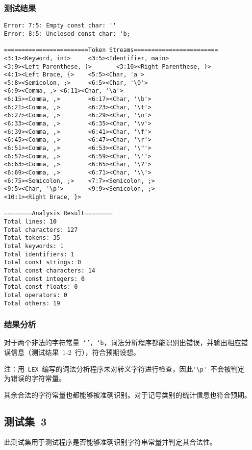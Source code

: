 \documentclass[lang=cn,11pt,a4paper]{paper}
\begin{document}
\subsubsection{测试结果}

\begin{lstlisting}
Error: 7:5: Empty const char: ''
Error: 8:5: Unclosed const char: 'b;

========================Token Streams========================
<3:1><Keyword, int>     <3:5><Identifier, main>
<3:9><Left Parenthese, (>       <3:10><Right Parenthese, )>
<4:1><Left Brace, {>    <5:5><Char, 'a'>
<5:8><Semicolon, ;>     <6:5><Char, '\0'>
<6:9><Comma, ,> <6:11><Char, '\a'>
<6:15><Comma, ,>        <6:17><Char, '\b'>
<6:21><Comma, ,>        <6:23><Char, '\t'>
<6:27><Comma, ,>        <6:29><Char, '\n'>
<6:33><Comma, ,>        <6:35><Char, '\v'>
<6:39><Comma, ,>        <6:41><Char, '\f'>
<6:45><Comma, ,>        <6:47><Char, '\r'>
<6:51><Comma, ,>        <6:53><Char, '\"'>
<6:57><Comma, ,>        <6:59><Char, '\''>
<6:63><Comma, ,>        <6:65><Char, '\?'>
<6:69><Comma, ,>        <6:71><Char, '\\'>
<6:75><Semicolon, ;>    <7:7><Semicolon, ;>
<9:5><Char, '\p'>       <9:9><Semicolon, ;>
<10:1><Right Brace, }>

========Analysis Result========
Total lines: 10
Total characters: 127
Total tokens: 35
Total keywords: 1
Total identifiers: 1
Total const strings: 0
Total const characters: 14
Total const integers: 0
Total const floats: 0
Total operators: 0
Total others: 19
\end{lstlisting}

\subsubsection{结果分析}

对于两个非法的字符常量\ \lstinline{‘’}，\lstinline{‘b}，词法分析程序都能识别出错误，并输出相应错误信息（测试结果\ 1-2\ 行），符合预期设想。

注：用\ \lstinline{LEX}\ 编写的词法分析程序未对转义字符进行检查，因此\lstinline{'\p'}\ 不会被判定为错误的字符常量。

其余合法的字符常量也都能够被准确识别。对于记号类别的统计信息也符合预期。

\subsection{测试集\ 3}

此测试集用于测试程序是否能够准确识别字符串常量并判定其合法性。
\end{document}
